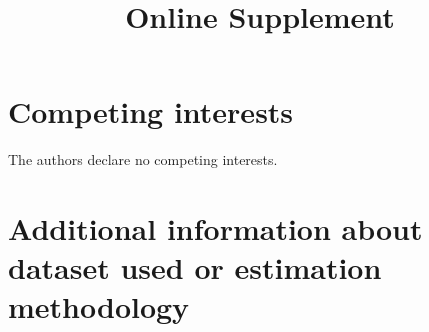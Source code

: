 \documentclass{article}
\newcommand{\beginsupplement}{
  \setcounter{table}{0}  
  \renewcommand{\thetable}{S\arabic{table}} 
  \setcounter{figure}{0} 
  \renewcommand{\thefigure}{S\arabic{figure}}
  \setcounter{section}{0} 
  \renewcommand{\thesection}{S\arabic{section}}
}
\begin{document}
\section*{Competing interests}

The authors declare no competing interests.





\clearpage
\beginsupplement
\title{\supptitlefont Online Supplement}
\maketitle

\section{Additional information about dataset used or estimation methodology}
\end{document}
